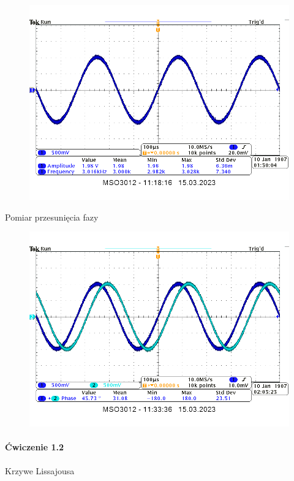 \documentclass[14pt, table]{extarticle}
\begin{document}
\begin{figure}[H]
\includegraphics[scale=0.7]{A15}
\centering
\end{figure}

Pomiar przesunięcia fazy
\begin{figure}[H]
\includegraphics[scale=0.7]{A4}
\centering
\end{figure}

\paragraph{Ćwiczenie 1.2 \\}
Krzywe Lissajousa
\end{document}
